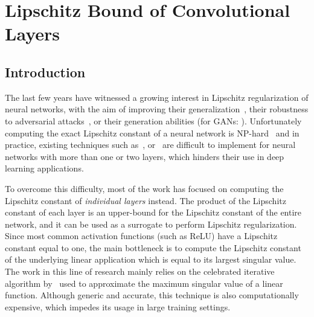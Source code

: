 \chapter{Lipschitz Bound of Convolutional Layers}
\label{chapter:ch5-lipschitz_bound}
\localtoc


\section{Introduction}
\label{section:ch5-introduction}


The last few years have witnessed a growing interest in Lipschitz regularization of neural networks, with the aim of improving their generalization~\cite{bartlett2017spectrally}, their robustness to adversarial attacks~\cite{tsuzuku2018lipschitz, farnia2018generalizable}, or their generation abilities (\eg for GANs: \citet{miyato2018spectral,arjovsky2017wasserstein}).
Unfortunately computing  the exact Lipschitz constant of a neural network is NP-hard~\cite{scaman2018lipschitz} and in practice, existing techniques such as~\citet{scaman2018lipschitz}, \citet{fazlyab2019efficient} or~\citet{latorre2020lipschitz} are difficult to implement for neural networks with more than one or two layers, which hinders their use in deep learning applications.

To overcome this difficulty, most of the work has focused on computing the Lipschitz constant of \emph{individual layers} instead.
The product of the Lipschitz constant of each layer is an upper-bound for the Lipschitz constant of the entire network, and it can be used as a surrogate to perform Lipschitz regularization.
Since most common activation functions (such as ReLU) have a Lipschitz constant equal to one, the main bottleneck is to compute the Lipschitz constant of the underlying linear application which is equal to its largest singular value.
The work in this line of research mainly relies on the celebrated iterative algorithm by~\citet{golub2000eigenvalue} used to approximate the maximum singular value of a linear function.
Although generic and accurate, this technique is also computationally expensive, which impedes its usage in large training settings.

